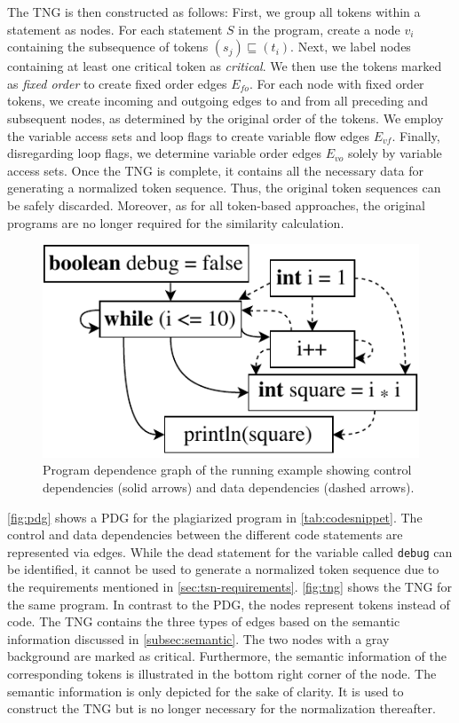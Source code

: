 \noindent
The TNG is then constructed as follows:
First, we group all tokens within a statement as nodes. %
For each statement \( S \) in the program, create a node \( v_i \) containing the subsequence of tokens \( (s_j) \sqsubseteq (t_i) \).
Next, we label nodes containing at least one critical token as \textit{critical}.
We then use the tokens marked as \textit{fixed order} to create fixed order edges $E_{fo}$.
For each node with fixed order tokens, we create incoming and outgoing edges to and from all preceding and subsequent nodes, as determined by the original order of the tokens.
We employ the variable access sets and loop flags to create variable flow edges $E_{vf}$.
Finally, disregarding loop flags, we determine variable order edges $E_{vo}$ solely by variable access sets.
Once the TNG is complete, it contains all the necessary data for generating a normalized token sequence. Thus, the original token sequences can be safely discarded.
Moreover, as for all token-based approaches, the original programs are no longer required for the similarity calculation.


\begin{figure}
\centering
\includegraphics[width=0.5\linewidth]{figures/pdg.pdf}
\caption[Program Dependence Graph]{Program dependence graph of the running example showing control dependencies (solid arrows) and data dependencies (dashed arrows).}
\label{fig:pdg}
\end{figure}


\autoref{fig:pdg} shows a PDG for the plagiarized program in \autoref{tab:codesnippet}. The control and data dependencies between the different code statements are represented via edges.
While the dead statement for the variable called \texttt{debug} can be identified, it cannot be used to generate a normalized token sequence due to the requirements mentioned in \autoref{sec:tsn-requirements}.
\autoref{fig:tng} shows the TNG for the same program. In contrast to the PDG, the nodes represent tokens instead of code. The TNG contains the three types of edges based on the semantic information discussed in \autoref{subsec:semantic}. The two nodes with a gray background are marked as critical. Furthermore, the semantic information of the corresponding tokens is illustrated in the bottom right corner of the node. 
The semantic information is only depicted for the sake of clarity. It is used to construct the TNG but is no longer necessary for the normalization thereafter.

